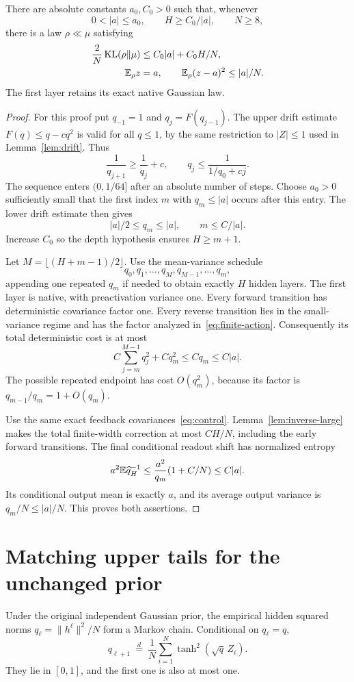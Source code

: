 \begin{theorem}
\label{thm:small-amplitude}
There are absolute constants $a_0,C_0>0$ such that, whenever
\[
 0<|a|\le a_0,\qquad H\ge C_0/|a|,\qquad N\ge8,
\]
there is a law $\rho\ll\mu$ satisfying
\begin{align}
 \frac2N\operatorname{KL}(\rho\|\mu)&\le C_0|a|+C_0H/N,\label{eq:linear-amplitude-cost}\\
 \mathbb E_\rho z&=a,\qquad \mathbb E_\rho(z-a)^2\le |a|/N.\label{eq:linear-amplitude-error}
\end{align}
The first layer retains its exact native Gaussian law.
\end{theorem}
\begin{proof}
For this proof put $q_{-1}=1$ and $q_j=F(q_{j-1})$. The upper drift estimate $F(q)\le q-cq^2$ is valid for all $q\le1$, by the same restriction to $|Z|\le1$ used in Lemma~\ref{lem:drift}. Thus
\[
 \frac1{q_{j+1}}\ge\frac1{q_j}+c,
 \qquad q_j\le\frac1{1/q_0+cj}.
\]
The sequence enters $(0,1/64]$ after an absolute number of steps. Choose $a_0>0$ sufficiently small that the first index $m$ with $q_m\le|a|$ occurs after this entry. The lower drift estimate then gives
\[
 |a|/2\le q_m\le|a|,\qquad m\le C/|a|.
\]
Increase $C_0$ so the depth hypothesis ensures $H\ge m+1$.

Let $M=\lfloor(H+m-1)/2\rfloor$. Use the mean-variance schedule
\[
 q_0,q_1,\ldots,q_M,q_{M-1},\ldots,q_m,
\]
appending one repeated $q_m$ if needed to obtain exactly $H$ hidden layers. The first layer is native, with preactivation variance one. Every forward transition has deterministic covariance factor one. Every reverse transition lies in the small-variance regime and has the factor analyzed in~\eqref{eq:finite-action}. Consequently its total deterministic cost is at most
\[
 C\sum_{j=m}^{M-1}q_j^2+Cq_m^2\le Cq_m\le C|a|.
\]
The possible repeated endpoint has cost $O(q_m^2)$, because its factor is $q_{m-1}/q_m=1+O(q_m)$.

Use the same exact feedback covariances~\eqref{eq:control}. Lemma~\ref{lem:inverse-large} makes the total finite-width correction at most $CH/N$, including the early forward transitions. The final conditional readout shift has normalized entropy
\[
 a^2\mathbb E\widehat q_H^{-1}\le\frac{a^2}{q_m}(1+C/N)\le C|a|.
\]
Its conditional output mean is exactly $a$, and its average output variance is $q_m/N\le|a|/N$. This proves both assertions.
\end{proof}

\section{Matching upper tails for the unchanged prior}
\label{sec:matching-upper}
Under the original independent Gaussian prior, the empirical hidden squared norms
$q_\ell=\|h^\ell\|^2/N$ form a Markov chain. Conditional on $q_\ell=q$,
\[
 q_{\ell+1}\ \stackrel{d}=\ \frac1N\sum_{i=1}^N\tanh^2(\sqrt q\,Z_i).
\]
They lie in $[0,1]$, and the first one is also at most one.

